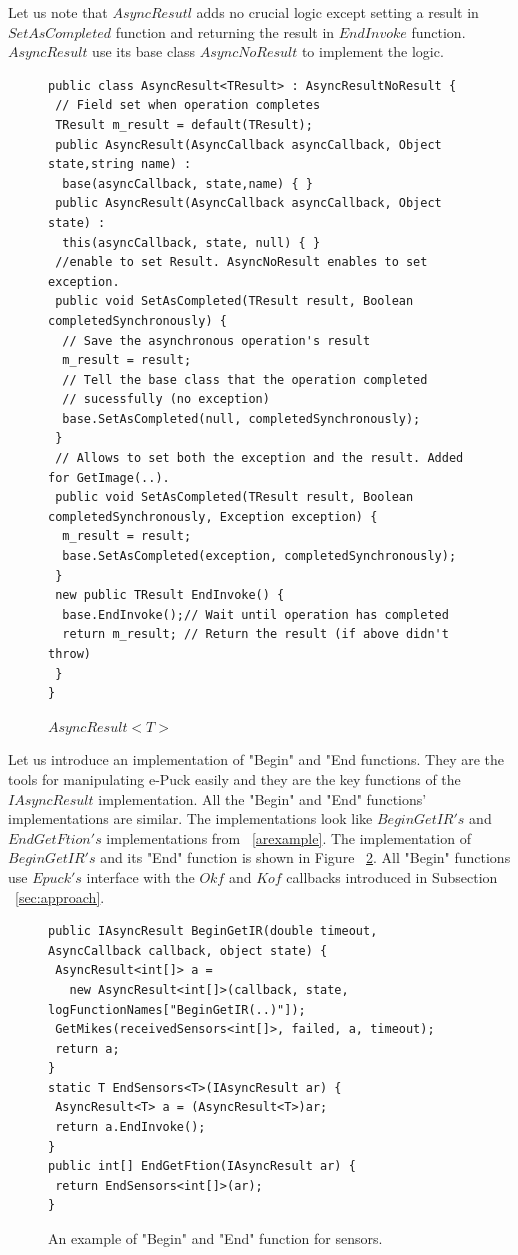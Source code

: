 \documentclass[12pt,notitlepage]{report}
\begin{document}
	Let us note that $AsyncResutl$ adds no crucial logic except setting a result in $SetAsCompleted$ function and
	returning the result in $EndInvoke$ function. 
	$AsyncResult$ use its base class $AsyncNoResult$ to implement the logic.
\begin{figure}[!hbp]
\begin{lstlisting}
public class AsyncResult<TResult> : AsyncResultNoResult {
 // Field set when operation completes
 TResult m_result = default(TResult);
 public AsyncResult(AsyncCallback asyncCallback, Object state,string name) : 
  base(asyncCallback, state,name) { }
 public AsyncResult(AsyncCallback asyncCallback, Object state) : 
  this(asyncCallback, state, null) { }
 //enable to set Result. AsyncNoResult enables to set exception.
 public void SetAsCompleted(TResult result, Boolean completedSynchronously) {
  // Save the asynchronous operation's result
  m_result = result;
  // Tell the base class that the operation completed 
  // sucessfully (no exception)
  base.SetAsCompleted(null, completedSynchronously);
 }
 // Allows to set both the exception and the result. Added for GetImage(..).
 public void SetAsCompleted(TResult result, Boolean completedSynchronously, Exception exception) {
  m_result = result;
  base.SetAsCompleted(exception, completedSynchronously);
 }
 new public TResult EndInvoke() {
  base.EndInvoke();// Wait until operation has completed 
  return m_result; // Return the result (if above didn't throw)
 }
}
\end{lstlisting}
\caption{$AsyncResult<T>$} \label{result}
\end{figure}

	Let us introduce an implementation of "Begin" and "End functions.
	They are the tools for manipulating e-Puck easily and they are the key functions of the $IAsyncResult$ implementation.
	All the "Begin" and "End" functions' implementations are similar. The implementations look like $BeginGetIR's$
	and $EndGetFtion's$ implementations from ~\ref{arexample}.
	The implementation of $BeginGetIR's$ and its "End" function is shown in Figure ~\ref{beginsens}.
	All "Begin" functions use $Epuck's$ interface with the $Okf$ and $Kof$ callbacks introduced
	in Subsection ~\ref{sec:approach}.	

\begin{figure}[!hbp]
\begin{lstlisting}
public IAsyncResult BeginGetIR(double timeout, AsyncCallback callback, object state) {
 AsyncResult<int[]> a = 
   new AsyncResult<int[]>(callback, state, logFunctionNames["BeginGetIR(..)"]);
 GetMikes(receivedSensors<int[]>, failed, a, timeout);
 return a;
}
static T EndSensors<T>(IAsyncResult ar) {
 AsyncResult<T> a = (AsyncResult<T>)ar;
 return a.EndInvoke();
}
public int[] EndGetFtion(IAsyncResult ar) { 
 return EndSensors<int[]>(ar); 
}
\end{lstlisting}	
\caption{An example of "Begin" and "End" function for sensors.}
\label{beginsens}
\end{figure}
\end{document}
